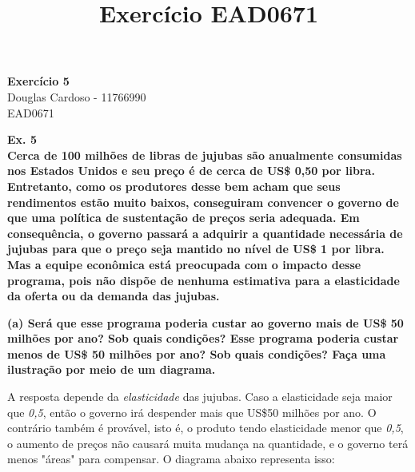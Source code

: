 \documentclass[12pt]{article}
\begin{document}
\title{Exercício EAD0671}


\begin{center}
    {\LARGE \bf Exercício 5} \\
    
    {\large Douglas Cardoso - 11766990}\\
EAD0671
\end{center}

\textbf{Ex. 5 \\
Cerca de 100 milhões de libras de jujubas são anualmente consumidas nos Estados Unidos e seu preço é de cerca de US\$ 0,50 por libra. Entretanto, como os produtores desse bem acham que seus rendimentos estão muito baixos, conseguiram convencer o governo de que uma política de sustentação de preços seria adequada. Em consequência, o governo passará a adquirir a quantidade necessária de jujubas para que o preço seja mantido no nível de US\$ 1 por libra. Mas a equipe econômica está preocupada com o impacto desse programa, pois não dispõe de nenhuma estimativa para a elasticidade da oferta ou da demanda das jujubas.}

\textbf{(a) Será que esse programa poderia custar ao governo mais de US\$ 50 milhões por ano? Sob quais condições? Esse programa poderia custar menos de US\$ 50 milhões por ano? Sob quais condições? Faça uma ilustração por meio de um diagrama.}

A resposta depende da \textit{elasticidade} das jujubas. Caso a elasticidade seja maior que \textit{0,5}, então o governo irá despender mais que US\$50 milhões por ano.  O contrário também é provável, isto é, o produto tendo elasticidade menor que \textit{0,5}, o aumento de preços não causará muita mudança na quantidade, e o governo terá menos "áreas" para compensar. O diagrama abaixo representa isso:

\begin{center}
\end{center}
\end{document}
